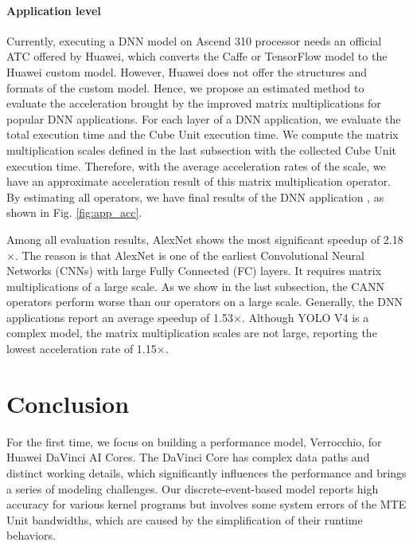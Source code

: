 \documentclass[12pt]{extbook}
\begin{document}
\paragraph{Application level}

Currently, executing a DNN model on Ascend 310 processor needs an official ATC offered by Huawei, which converts the Caffe or TensorFlow model to the Huawei custom model. However, Huawei does not offer the structures and formats of the custom model. Hence, we propose an estimated method to evaluate the acceleration brought by the improved matrix multiplications for popular DNN applications. For each layer of a DNN application, we evaluate the total execution time and the Cube Unit execution time. We compute the matrix multiplication scales defined in the last subsection with the collected Cube Unit execution time. Therefore, with the average acceleration rates of the scale, we have an approximate acceleration result of this matrix multiplication operator. By estimating all operators, we have final results of the DNN application \cite{DBLP:conf/cvpr/HeZRS16, DBLP:journals/corr/abs-2004-10934, DBLP:conf/cvpr/SandlerHZZC18, DBLP:conf/nips/KrizhevskySH12, DBLP:conf/naacl/DevlinCLT19}, as shown in Fig. \ref{fig:app_acc}.

Among all evaluation results, AlexNet shows the most significant speedup of 2.18$\times$. The reason is that AlexNet is one of the earliest Convolutional Neural Networks (CNNs) with large Fully Connected (FC) layers. It requires matrix multiplications of a large scale. As we show in the last subsection, the CANN operators perform worse than our operators on a large scale. Generally, the DNN applications report an average speedup of 1.53$\times$. Although YOLO V4 is a complex model, the matrix multiplication scales are not large, reporting the lowest acceleration rate of 1.15$\times$.

\section{Conclusion}

For the first time, we focus on building a performance model, Verrocchio, for Huawei DaVinci AI Cores. The DaVinci Core has complex data paths and distinct working details, which significantly influences the performance and brings a series of modeling challenges. Our discrete-event-based model reports high accuracy for various kernel programs but involves some system errors of the MTE Unit bandwidths, which are caused by the simplification of their runtime behaviors.
\end{document}
